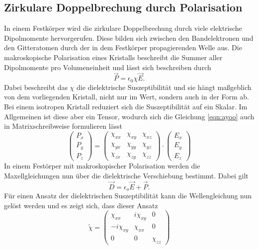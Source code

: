 \subsection{Zirkulare Doppelbrechung durch Polarisation}
In einem Festkörper wird die zirkulare Doppelbrechung durch viele elektrische Dipolmomente hervorgerufen. Diese bilden sich zwischen den Bandelektronen
und den Gitteratomen durch der in dem Festkörper propagierenden Welle aus.
Die makroskopische Polarisation eines Kristalls beschreibt die Summer aller Dipolmomente pro Volumeneinheit und lässt sich beschreiben durch
\begin{equation}
    \label{eqn:ayoo}
\vec{P} = \epsilon_0 \chi \vec{E}.
\end{equation}
Dabei beschreibt das $\chi$ die dielektrische Suszeptibilität und sie hängt maßgeblich von dem vorliegenden Kristall, nicht nur im Wert, sondern auch in der Form ab.
Bei einem isotropen Kristall reduziert sich die Suszeptibilität auf ein Skalar. Im Allgemeinen ist diese aber ein Tensor, wodurch sich die Gleichung \ref{eqn:ayoo} auch in Matrixschreibweise formulieren lässt
\begin{equation*}
\begin{pmatrix}
P_x \\
P_y \\
P_z 
\end{pmatrix} = 
\begin{pmatrix}
\chi_{xx} & \chi_{xy} & \chi_{xz} \\
\chi_{yx} & \chi_{yy} & \chi_{yz} \\
\chi_{zx} & \chi_{zy} & \chi_{zz}
\end{pmatrix}
\cdot 
\begin{pmatrix}
E_x \\
E_y \\
E_z 
\end{pmatrix}
\end{equation*}
In einem Festörper mit makroskopischer Polarisation werden die Maxellgleichungen nun über die dielektrische Verschiebung bestimmt. 
Dabei gilt
\begin{equation*}
\vec{D} = \epsilon_o \vec{E} + \vec{P}.
\end{equation*}
Für einen Ansatz der dielektrischen Suszeptibilität kann die Wellengleichung nun gelöst werden und es zeigt sich, dass dieser Ansatz
\begin{equation}
    \label{eqn:lolwtf}
    \tilde{\chi} = \begin{pmatrix}
        \chi_{xx} & i\chi_{xy} & 0 \\
        -i\chi_{xy} & \chi_{xx} & 0 \\
        0 & 0 & \chi_{zz}
        \end{pmatrix}
\end{equation}
